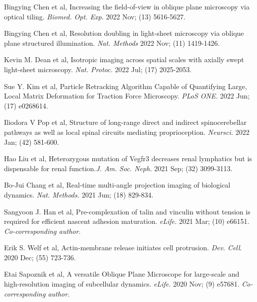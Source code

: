 \begin{etaremune}
\item Bingying Chen et al, Increasing the field-of-view in oblique plane microscopy via optical tiling. {\it Biomed. Opt. Exp.} 2022 Nov; (13) 5616-5627.

\item Bingying Chen et al, Resolution doubling in light-sheet microscopy via oblique plane structured illumination. {\it Nat. Methods} 2022 Nov; (11) 1419-1426.

\item Kevin M. Dean et al, Isotropic imaging across spatial scales with axially swept light-sheet microscopy. {\it Nat. Protoc.} 2022 Jul; (17) 2025-2053.

\item Sue Y. Kim et al, Particle Retracking Algorithm Capable of Quantifying Large, Local Matrix Deformation for Traction Force Microscopy. {\it PLoS ONE.} 2022 Jun; (17) e0268614. 

\item Iliodora V Pop et al, Structure of long-range direct and indirect spinocerebellar pathways as well as local spinal circuits mediating proprioception. {\it Neursci.} 2022 Jan; (42) 581-600.

\item Hao Liu et al, Heterozygous mutation of Vegfr3 decreases renal lymphatics but is dispensable for renal function.{\it J. Am. Soc. Neph.} 2021 Sep; (32) 3099-3113.

\item Bo-Jui Chang et al, Real-time multi-angle projection imaging of biological dynamics. {\it Nat. Methods.} 2021 Jun; (18) 829-834.

\item Sangyoon J. Han et al, Pre-complexation of talin and vinculin without tension is required for efficient nascent adhesion maturation. {\it eLife.} 2021 Mar; (10) e66151. {\it Co-corresponding author.}

\item Erik S. Welf et al, Actin-membrane release initiates cell protrusion.  {\it Dev. Cell}. 2020 Dec; (55) 723-736.

\item  Etai Sapoznik et al, A versatile Oblique Plane Microscope for large-scale and high-resolution imaging of subcellular dynamics.  {\it eLife.} 2020 Nov; (9) e57681. {\it Co-corresponding author.}


\end{etaremune}
